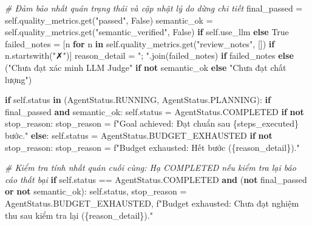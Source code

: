 \documentclass[]{article}
\newenvironment{Shaded}{}{}
\newcommand{\CommentTok}[1]{\textcolor[rgb]{0.38,0.63,0.69}{\textit{#1}}}
\newcommand{\ControlFlowTok}[1]{\textcolor[rgb]{0.00,0.44,0.13}{\textbf{#1}}}
\newcommand{\KeywordTok}[1]{\textcolor[rgb]{0.00,0.44,0.13}{\textbf{#1}}}
\newcommand{\NormalTok}[1]{#1}
\newcommand{\OperatorTok}[1]{\textcolor[rgb]{0.40,0.40,0.40}{#1}}
\newcommand{\SpecialCharTok}[1]{\textcolor[rgb]{0.25,0.44,0.63}{#1}}
\newcommand{\SpecialStringTok}[1]{\textcolor[rgb]{0.73,0.40,0.53}{#1}}
\newcommand{\StringTok}[1]{\textcolor[rgb]{0.25,0.44,0.63}{#1}}
\newcommand{\VariableTok}[1]{\textcolor[rgb]{0.10,0.09,0.49}{#1}}
\newcommand{\xmark}{{\symbolfont ✗}}
\begin{document}
\begin{Shaded}
\begin{Highlighting}[fontsize=\scriptsize]
        \CommentTok{# Đảm bảo nhất quán trạng thái và cập nhật lý do dừng chi tiết}
\NormalTok{        final_passed }\OperatorTok{=} \VariableTok{self}\NormalTok{.quality_metrics.get(}\StringTok{"passed"}\NormalTok{, }\VariableTok{False}\NormalTok{)}
\NormalTok{        semantic_ok }\OperatorTok{=} \VariableTok{self}\NormalTok{.quality_metrics.get(}\StringTok{"semantic_verified"}\NormalTok{, }\VariableTok{False}\NormalTok{) }\ControlFlowTok{if} \VariableTok{self}\NormalTok{.use_llm }\ControlFlowTok{else} \VariableTok{True}
\NormalTok{        failed_notes }\OperatorTok{=}\NormalTok{ [n }\ControlFlowTok{for}\NormalTok{ n }\KeywordTok{in} \VariableTok{self}\NormalTok{.quality_metrics.get(}\StringTok{"review_notes"}\NormalTok{, []) }\ControlFlowTok{if}\NormalTok{ n.startswith(}\StringTok{"\xmark"}\NormalTok{)]}
\NormalTok{        reason_detail }\OperatorTok{=} \StringTok{"; "}\NormalTok{.join(failed_notes) }\ControlFlowTok{if}\NormalTok{ failed_notes }\ControlFlowTok{else}\NormalTok{ (}\StringTok{"Chưa đạt xác minh LLM Judge"} \ControlFlowTok{if} \KeywordTok{not}\NormalTok{ semantic_ok }\ControlFlowTok{else} \StringTok{"Chưa đạt chất lượng"}\NormalTok{)}

        \ControlFlowTok{if} \VariableTok{self}\NormalTok{.status }\KeywordTok{in}\NormalTok{ (AgentStatus.RUNNING, AgentStatus.PLANNING):}
            \ControlFlowTok{if}\NormalTok{ final_passed }\KeywordTok{and}\NormalTok{ semantic_ok:}
                \VariableTok{self}\NormalTok{.status }\OperatorTok{=}\NormalTok{ AgentStatus.COMPLETED}
                \ControlFlowTok{if} \KeywordTok{not}\NormalTok{ stop_reason: stop_reason }\OperatorTok{=} \SpecialStringTok{f"Goal achieved: Đạt chuẩn sau }\SpecialCharTok{\{}\NormalTok{steps_executed}\SpecialCharTok{\}}\SpecialStringTok{ bước."}
            \ControlFlowTok{else}\NormalTok{:}
                \VariableTok{self}\NormalTok{.status }\OperatorTok{=}\NormalTok{ AgentStatus.BUDGET_EXHAUSTED}
                \ControlFlowTok{if} \KeywordTok{not}\NormalTok{ stop_reason: stop_reason }\OperatorTok{=} \SpecialStringTok{f"Budget exhausted: Hết bước (}\SpecialCharTok{\{}\NormalTok{reason_detail}\SpecialCharTok{\}}\SpecialStringTok{)."}

        \CommentTok{# Kiểm tra tính nhất quán cuối cùng: Hạ COMPLETED nếu kiểm tra lại báo cáo thất bại}
        \ControlFlowTok{if} \VariableTok{self}\NormalTok{.status }\OperatorTok{==}\NormalTok{ AgentStatus.COMPLETED }\KeywordTok{and}\NormalTok{ (}\KeywordTok{not}\NormalTok{ final_passed }\KeywordTok{or} \KeywordTok{not}\NormalTok{ semantic_ok):}
            \VariableTok{self}\NormalTok{.status, stop_reason }\OperatorTok{=}\NormalTok{ AgentStatus.BUDGET_EXHAUSTED, }\SpecialStringTok{f"Budget exhausted: Chưa đạt nghiệm thu sau kiểm tra lại (}\SpecialCharTok{\{}\NormalTok{reason_detail}\SpecialCharTok{\}}\SpecialStringTok{)."}


\end{Highlighting}
\end{Shaded}
\end{document}
